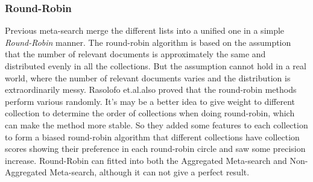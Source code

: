 \subsubsection{Round-Robin} 
Previous meta-search merge the different lists into a unified one in a simple \textit{Round-Robin} manner\cite{Rasolofo2003}. The round-robin algorithm is based on the assumption that the number of relevant documents is approximately the same and distributed evenly in all the collections\cite{Rasolofo2001,Rasolofo2003}. But the assumption cannot hold in a real world, where the number of relevant documents varies and the distribution is extraordinarily messy. Rasolofo et.al.\cite{Rasolofo2003}also proved that the round-robin methods perform various randomly. It's may be a better idea to give weight to different collection to determine the order of collections when doing round-robin, which can make the method more stable. So they added some features to each collection to form a biased round-robin algorithm that different collections have collection scores showing their preference in each round-robin circle\cite{Rasolofo2003} and saw some precision increase. Round-Robin can fitted into both the Aggregated Meta-search and Non-Aggregated Meta-search, although it can not give a perfect result.

